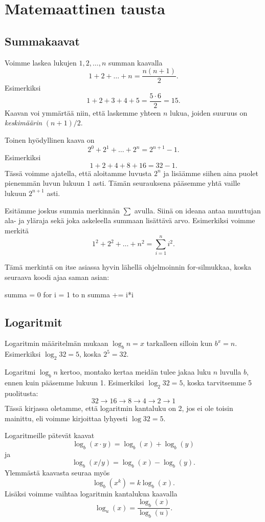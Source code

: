 \chapter{Matemaattinen tausta}

\section*{Summakaavat}

Voimme laskea lukujen $1,2,\dots,n$ summan kaavalla
\[1+2+\dots+n = \frac{n(n+1)}{2}.\]
Esimerkiksi
\[1+2+3+4+5 = \frac{5 \cdot 6}{2}=15.\]
Kaavan voi ymmärtää niin, että laskemme yhteen $n$ lukua,
joiden suuruus on \emph{keskimäärin} $(n+1)/2$.

Toinen hyödyllinen kaava on
\[2^0+2^1+\dots+2^n = 2^{n+1}-1.\]
Esimerkiksi
\[1+2+4+8+16=32-1.\]
Tässä voimme ajatella, että aloitamme luvusta $2^n$
ja lisäämme siihen aina puolet pienemmän luvun lukuun $1$ asti.
Tämän seurauksena pääsemme yhtä vaille lukuun $2^{n+1}$ asti.

Esitämme joskus summia merkinnän $\sum$ avulla.
Siinä on ideana antaa muuttujan ala- ja yläraja sekä
joka askeleella summaan lisättävä arvo.
Esimerkiksi voimme merkitä
\[1^2 + 2^2 + \dots + n^2 = \sum_{i=1}^n i^2.\]

Tämä merkintä on itse asiassa hyvin lähellä ohjelmoinnin
for-silmukkaa, koska seuraava koodi ajaa saman asian:

\begin{code}
summa = 0
for i = 1 to n
    summa += i*i
\end{code}

\section*{Logaritmit}

Logaritmin määritelmän mukaan $\log_b n =x$
tarkalleen silloin kun $b^x=n$.
Esimerkiksi $\log_2 32=5$, koska $2^5=32$.

Logaritmi $\log_b n$ kertoo,
montako kertaa meidän tulee jakaa luku $n$ luvulla $b$,
ennen kuin pääsemme lukuun 1.
Esimerkiksi $\log_2 32 =5$, koska tarvitsemme 5 puolitusta:
\[32 \rightarrow 16 \rightarrow 8 \rightarrow 4 \rightarrow 2 \rightarrow 1\]
Tässä kirjassa oletamme, että logaritmin kantaluku on 2,
jos ei ole toisin mainittu,
eli voimme kirjoittaa lyhyesti $\log 32 = 5$.

Logaritmeille pätevät kaavat
\[\log_b(x \cdot y) = \log_b(x)+\log_b(y)\]
ja
\[\log_b(x / y) = \log_b(x)-\log_b(y).\]
Ylemmästä kaavasta seuraa myös
\[\log_b(x^k) = k \log_b(x).\]
Lisäksi voimme vaihtaa logaritmin kantalukua kaavalla
\[\log_u(x) = \frac{\log_b(x)}{\log_b(u)}.\]
